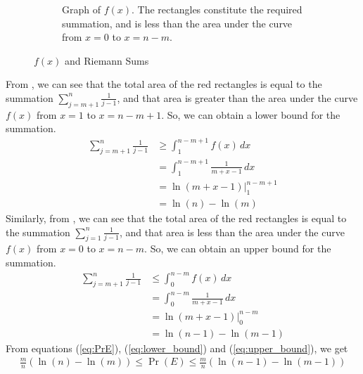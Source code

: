 \begin{figure}[H]
\begin{subfigure}{.34\textwidth}
		\caption{Graph of $f(x)$. The rectangles constitute the required summation, and is less than the area under the curve from $x=0$ to $x=n-m$.}
		\label{fig:upper_bound}
	\end{subfigure}
	\caption{\label{fig:riemann} $f(x)$ and Riemann Sums}
\end{figure}
From , we can see that the total area of the red rectangles is equal to the summation $\sum_{j=m+1}^n\frac{1}{j-1}$, and that area is greater than the area under the curve $f(x)$ from $x=1$ to $x=n-m+1$.
So, we can obtain a lower bound for the summation.
\begin{align}
	\sum_{j=m+1}^n\frac{1}{j-1} & \geq \int_{1}^{n-m+1} f(x) \, dx \nonumber         \\
	                            & = \int_{1}^{n-m+1} \frac{1}{m+x-1} \, dx \nonumber \\
	                            & = \ln(m+x-1)\Big|_1^{n-m+1} \nonumber              \\
	                            & = \ln(n) - \ln(m) \label{eq:lower_bound}
\end{align}
Similarly, from , we can see that the total area of the red rectangles is equal to the summation $\sum_{j=1}^n\frac{1}{j-1}$, and that area is less than the area under the curve $f(x)$ from $x=0$ to $x=n-m$.
So, we can obtain an upper bound for the summation.
\begin{align}
	\sum_{j=m+1}^n\frac{1}{j-1} & \leq \int_{0}^{n-m} f(x) \, dx \nonumber         \\
	                            & = \int_{0}^{n-m} \frac{1}{m+x-1} \, dx \nonumber \\
	                            & = \ln(m+x-1)\Big|_0^{n-m} \nonumber              \\
	                            & = \ln(n-1) - \ln(m-1) \label{eq:upper_bound}
\end{align}
From equations (\ref{eq:PrE}), (\ref{eq:lower_bound}) and (\ref{eq:upper_bound}), we get
\begin{align}\label{eq:final_bound}
	\frac{m}{n} \left(\ln(n) - \ln(m)\right) \leq \Pr(E) \leq \frac{m}{n} \left(\ln(n-1) - \ln(m-1)\right)
\end{align}

